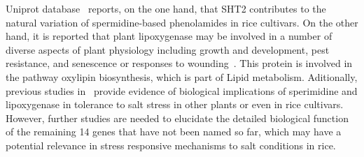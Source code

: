 Uniprot database~\cite{uniprot2018uniprot} reports, on the one hand,
that SHT2 contributes to the natural variation of spermidine-based
phenolamides in rice cultivars. On the other hand, it is reported that
plant lipoxygenase may be involved in a number of diverse aspects of
plant physiology including growth and development, pest resistance,
and senescence or responses to wounding~\cite{uniprot2018uniprot}. This protein is involved in
the pathway oxylipin biosynthesis, which is part of Lipid
metabolism. Aditionally, previous studies
%
in~\cite{gupta2013plant,hou2015persimmon,mittova2002salt,peng2019novel,roychoudhury2011amelioration}
%
provide evidence of biological implications of sperimidine and
lipoxygenase in tolerance to salt stress in other plants or even in
rice cultivars. However, further studies are needed to elucidate the
detailed biological function of the remaining 14 genes that have not
been named so far, which may have a potential relevance in stress
responsive mechanisms to salt conditions in rice.
